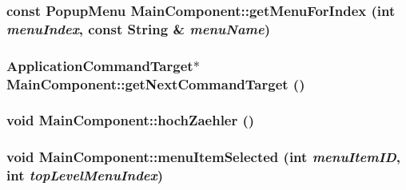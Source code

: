 \begin{CompactItemize}
\hypertarget{class_main_component_a4cf0e0810822da0005fe2d1acb0a44c}{
\subsubsection[{getMenuForIndex}]{\setlength{\rightskip}{0pt plus 5cm}const PopupMenu MainComponent::getMenuForIndex (int {\em menuIndex}, \/  const String \& {\em menuName})}}
\label{class_main_component_a4cf0e0810822da0005fe2d1acb0a44c}


\hypertarget{class_main_component_8abcff99d8e49093f0d023d371e45231}{
\subsubsection[{getNextCommandTarget}]{\setlength{\rightskip}{0pt plus 5cm}ApplicationCommandTarget$\ast$ MainComponent::getNextCommandTarget ()}}
\label{class_main_component_8abcff99d8e49093f0d023d371e45231}


\hypertarget{class_main_component_47a6bdef6f95e11da90fd34fb2361349}{
\subsubsection[{hochZaehler}]{\setlength{\rightskip}{0pt plus 5cm}void MainComponent::hochZaehler ()}}
\label{class_main_component_47a6bdef6f95e11da90fd34fb2361349}


\hypertarget{class_main_component_0a2ea996cdf1ed8cba668dc7f4bbb958}{
\subsubsection[{menuItemSelected}]{\setlength{\rightskip}{0pt plus 5cm}void MainComponent::menuItemSelected (int {\em menuItemID}, \/  int {\em topLevelMenuIndex})}}
\label{class_main_component_0a2ea996cdf1ed8cba668dc7f4bbb958}



\end{CompactItemize}
